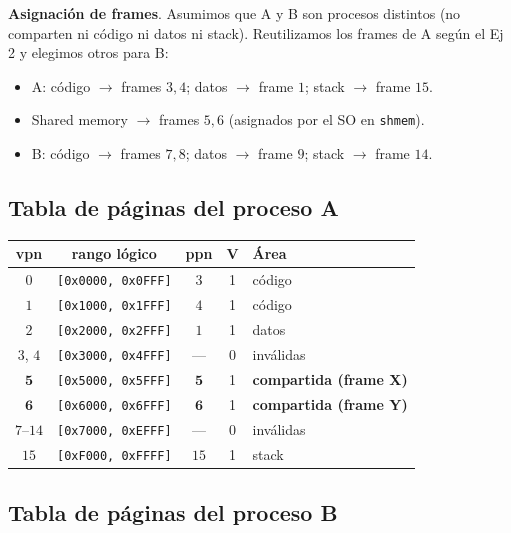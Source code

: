 \documentclass[11pt,a4paper]{article}
\begin{document}
\textbf{Asignación de frames}. Asumimos que A y B son procesos
distintos (no comparten ni código ni datos ni stack). Reutilizamos
los frames de A según el Ej 2 y elegimos otros para B:

\begin{itemize}[leftmargin=*,nosep]
    \item A: código $\to$ frames $3,4$; datos $\to$ frame $1$; stack $\to$ frame $15$.
    \item Shared memory $\to$ frames $5, 6$ (asignados por el SO en \texttt{shmem}).
    \item B: código $\to$ frames $7,8$; datos $\to$ frame $9$; stack $\to$ frame $14$.
\end{itemize}

\subsection*{Tabla de páginas del proceso A}

\begin{center}
\small
\begin{tabular}{@{}ccccp{4.2cm}@{}}
\toprule
vpn      & rango lógico                 & ppn & V & Área \\
\midrule
$0$      & \texttt{[0x0000, 0x0FFF]}    & $3$  & 1 & código \\
$1$      & \texttt{[0x1000, 0x1FFF]}    & $4$  & 1 & código \\
$2$      & \texttt{[0x2000, 0x2FFF]}    & $1$  & 1 & datos \\
$3$, $4$ & \texttt{[0x3000, 0x4FFF]}    & ---  & 0 & inválidas \\
$\boldsymbol{5}$ & \texttt{[0x5000, 0x5FFF]} & $\boldsymbol{5}$ & 1 & \textbf{compartida (frame X)} \\
$\boldsymbol{6}$ & \texttt{[0x6000, 0x6FFF]} & $\boldsymbol{6}$ & 1 & \textbf{compartida (frame Y)} \\
$7$--$14$ & \texttt{[0x7000, 0xEFFF]}   & ---  & 0 & inválidas \\
$15$     & \texttt{[0xF000, 0xFFFF]}    & $15$ & 1 & stack \\
\bottomrule
\end{tabular}
\end{center}

\subsection*{Tabla de páginas del proceso B}
\end{document}
